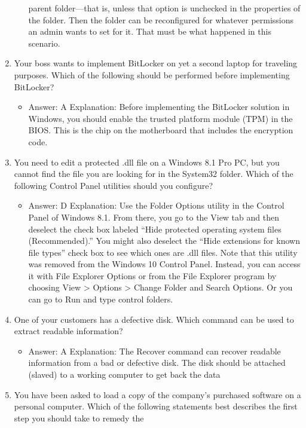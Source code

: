 \documentclass{article}
\begin{document}
\begin{enumerate}
\begin{itemize}
parent folder—that is, unless that option is unchecked in the properties of the folder.
Then the folder can be reconfigured for whatever permissions an admin wants to set
for it. That must be what happened in this scenario.
    \end{itemize}
    \item Your boss wants to implement BitLocker on yet a second laptop
for traveling purposes. Which of the following should be performed
before implementing BitLocker?
    \begin{itemize}
        \item Answer: A
Explanation: Before implementing the BitLocker solution in Windows, you should
enable the trusted platform module (TPM) in the BIOS. This is the chip on the motherboard
that includes the encryption code.
    \end{itemize}
    \item You need to edit a protected .dll file on a Windows 8.1 Pro PC, but
you cannot find the file you are looking for in the System32 folder.
Which of the following Control Panel utilities should you configure?
    \begin{itemize}
        \item Answer: D
Explanation: Use the Folder Options utility in the Control Panel of Windows 8.1.
From there, you go to the View tab and then deselect the check box labeled “Hide
protected operating system files (Recommended).” You might also deselect the “Hide
extensions for known file types” check box to see which ones are .dll files. Note
that this utility was removed from the Windows 10 Control Panel. Instead, you can
access it with File Explorer Options or from the File Explorer program by choosing
View > Options > Change Folder and Search Options. Or you can go to Run and type
control folders.
    \end{itemize}
    \item One of your customers has a defective disk. Which command
can be used to extract readable information?
    \begin{itemize}
        \item Answer: A
Explanation: The Recover command can recover readable information from a bad or
defective disk. The disk should be attached (slaved) to a working computer to get back
the data
    \end{itemize}
    \item You have been asked to load a copy of the company’s purchased
software on a personal computer. Which of the following statements
best describes the first step you should take to remedy the

\end{enumerate}
\end{document}

